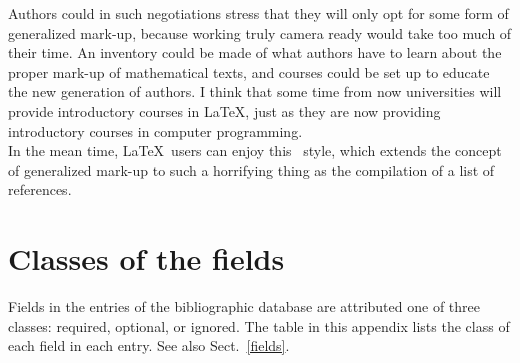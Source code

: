 Authors could in such negotiations stress that they will only opt for some
form of generalized mark-up, because working truly camera ready would
take too much of their time.
An inventory could be made of what authors have to learn about the proper
mark-up of mathematical texts, and courses could be set up to educate the
new generation of authors.
I think that some time from now universities will provide introductory courses
in \LaTeX, just as they are now providing introductory courses in computer
programming. \smallskip \\

In the mean time, \LaTeX\ users can enjoy this \BibTeX\ style, which extends
the concept of generalized mark-up to such a horrifying thing as the
compilation of a list of references.



\newpage
\section{Classes of the fields}
\label{classes}

Fields in the entries of the bibliographic database are attributed one of
three classes: required, optional, or ignored.
The table in this appendix lists the class of each field in each entry.
See also Sect.~\ref{fields}.

\newcommand{\R}{{\sl R}}
\renewcommand{\O}{{\sl O}}
\newcommand{\I}{--}

